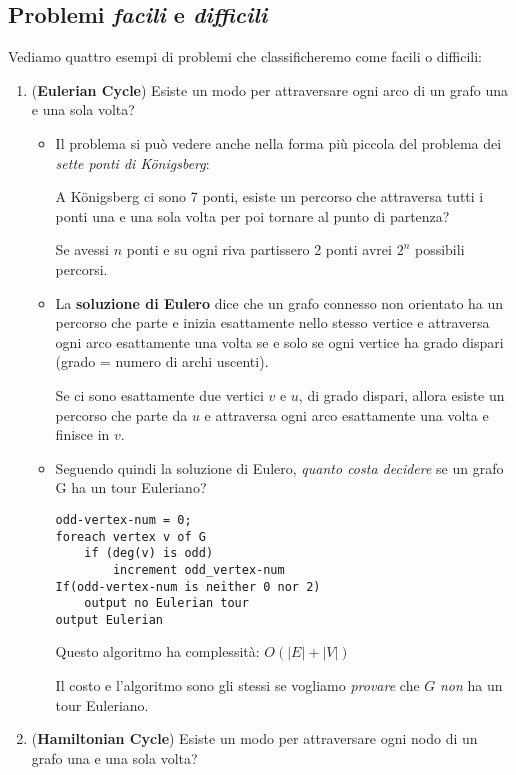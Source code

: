 \documentclass[a4paper]{article}
\theoremstyle{definition}
\begin{document}
	\subsection{Problemi \textit{facili} e \textit{difficili}}
		Vediamo quattro esempi di problemi che classificheremo come facili o difficili:
		\begin{enumerate}
			\item (\textbf{Eulerian Cycle}) Esiste un modo per attraversare ogni arco di un grafo una e una sola volta?
			
			\begin{itemize}
				\item Il problema si può vedere anche nella forma più piccola del problema dei \textit{sette ponti di Königsberg}:
			
				A Königsberg ci sono 7 ponti, esiste un percorso che attraversa tutti i ponti una e una sola volta per poi tornare al punto di partenza?
			
				Se avessi $ n $ ponti e su ogni riva partissero 2 ponti avrei $ 2^n $ possibili percorsi.
			
				\item La \textbf{soluzione di Eulero} dice che un grafo connesso non orientato ha un percorso che parte e inizia esattamente nello stesso vertice e attraversa ogni arco esattamente una volta se e solo se ogni vertice ha grado dispari (grado = numero di archi uscenti).
				
				Se ci sono esattamente due vertici $ v $ e $ u $, di grado dispari, allora esiste un percorso che parte da $ u $ e attraversa ogni arco esattamente una volta e finisce in $ v $.
				
				\item Seguendo quindi la soluzione di Eulero, \textit{quanto costa decidere} se un grafo G ha un tour Euleriano?
				\begin{lstlisting}[basicstyle=\footnotesize\ttfamily]
odd-vertex-num = 0;
foreach vertex v of G
	if (deg(v) is odd)
		increment odd_vertex-num
If(odd-vertex-num is neither 0 nor 2)
	output no Eulerian tour
output Eulerian	
				\end{lstlisting}
				Questo algoritmo ha complessità: $ O(|E| + |V|) $
				
				Il costo e l'algoritmo sono gli stessi se vogliamo \textit{provare} che $ G $ \textit{non} ha un tour Euleriano.
				
			\end{itemize}
			
			\item (\textbf{Hamiltonian Cycle}) Esiste un modo per attraversare ogni nodo di un grafo una e una sola volta? 
			

\end{enumerate}
\end{document}
